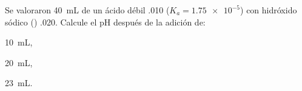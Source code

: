 Se valoraron \SI{40}{\milli\liter} de un ácido débil  \SI{,010}{\Molar} ($K_a = \num{1,75e-5}$) con hidróxido sódico () \SI{,020}{\Molar}. Calcule el pH después de la adición de:
	\begin{enumerate*}[label={\alph*)},font=\bfseries]
		 \item \SI{10}{\milli\liter},
		 \item \SI{20}{\milli\liter},
		 \item \SI{23}{\milli\liter}.
	\end{enumerate*}
